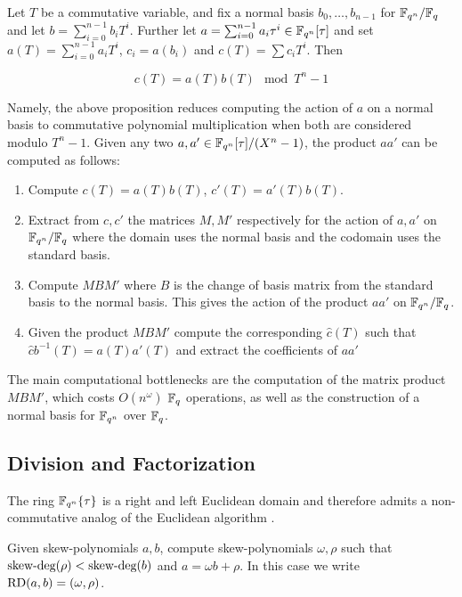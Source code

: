 \begin{proposition*}{\cite[Prop. 1.6]{CaLe17}}
Let $T$ be a commutative variable, and fix a normal basis $b_0, \ldots, b_{n-1}$ for $\mathbb{F}_{q^n}/\mathbb{F}_q$ and let $b = \sum_{i=0}^{n-1} b_i T^i$. Further let $a = \sum_{i=0}^{n-1} a_i \tau^i\in \mathbb{F}_{q^n}[\tau]$ and set $a(T) = \sum_{i=0}^{n-1} a_i T^i$, $c_i = a(b_i)$ and $c(T) = \sum c_iT^i$. Then

\begin{equation*}
    c(T) = a(T)b(T) \mod T^n -1
\end{equation*}

\end{proposition*}

Namely, the above proposition reduces computing the action of $a$ on a normal basis to commutative polynomial multiplication when both are considered modulo $T^n - 1$. Given any two $a, a' \in \mathbb{F}_{q^n}[\tau]/(X^n - 1)$, the product $aa'$ can be computed as follows:

\begin{enumerate}
    \item Compute $c(T) = a(T) b(T)$, $c'(T) = a'(T)b(T)$.
    \item Extract from $c,c'$ the matrices $M,M'$ respectively for the action of $a, a'$ on $\mathbb{F}_{q^n}/\mathbb{F}_q$ where the domain uses the normal basis and the codomain uses the standard basis.
    \item Compute $M B M'$ where $B$ is the change of basis matrix from the standard basis to the normal basis. This gives the action of the product $aa'$ on $\mathbb{F}_{q^n}/\mathbb{F}_q$.
    \item Given the product $MBM'$ compute the corresponding $\hat{c}(T)$ such that $\hat{c}b^{-1}(T) = a(T)a'(T)$ and extract the coefficients of $aa'$
\end{enumerate}

The main computational bottlenecks are the computation of the matrix product $MBM'$, which costs $O(n^{\omega})$ $\mathbb{F}_q$ operations, as well as the construction of a normal basis for $\mathbb{F}_{q^n}$ over $\mathbb{F}_q$. 

\subsection{Division and Factorization}

The ring $\mathbb{F}_{q^n}\{\tau\}$ is a right and left Euclidean domain and therefore admits a non-commutative analog of the Euclidean algorithm \cite{ore}. 

\begin{problem}
Given skew-polynomials $a, b$, compute skew-polynomials $\omega, \rho$ such that $\textnormal{skew-deg}(\rho) < \textnormal{skew-deg}(b)$ and $a = \omega b + \rho$. In this case we write $\textnormal{RD}(a, b) = (\omega, \rho)$. 
\end{problem}

